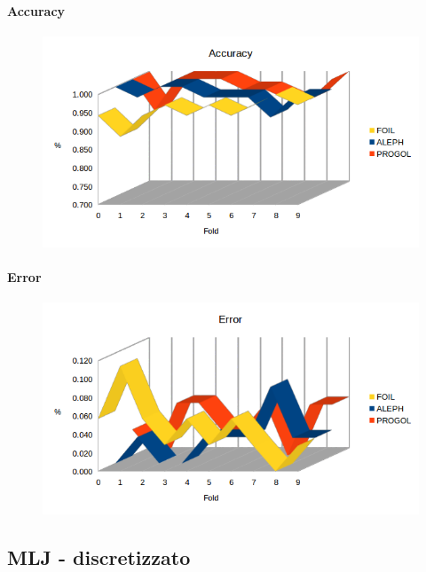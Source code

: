 \paragraph{Accuracy}
\begin{figure}[H]
	\includegraphics[width=1.1\textwidth]{img/datasetGraph/svln/accuracy.png}
	\label{svln-Accuracy}
\end{figure}
\paragraph{Error}
\begin{figure}[H]
	\includegraphics[width=1.1\textwidth]{img/datasetGraph/svln/error.png}
	\label{svln-Error}
\end{figure}

\subsection{MLJ - discretizzato}
